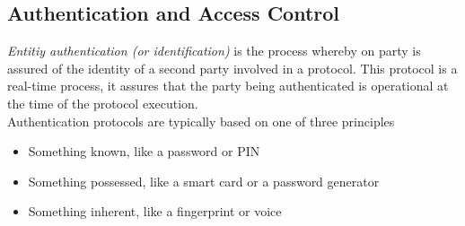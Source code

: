 \documentclass[a4paper, 10 pt, conference]{ieeeconf}
\begin{document}
\subsection{\textbf{Authentication and Access Control}}
\emph{Entitiy authentication (or identification)} is the process whereby on party is assured of the identity of a second party involved in a protocol. This protocol is a real-time process, it assures that the party being authenticated is operational at the time of the protocol execution. \\
Authentication protocols are typically based on one of three principles
\begin{itemize}
\item Something known, like a password or PIN
\item Something possessed, like a smart card or a password generator
\item Something inherent, like a fingerprint or voice
\end{itemize}

\vspace{0.5cm}
\end{document}

